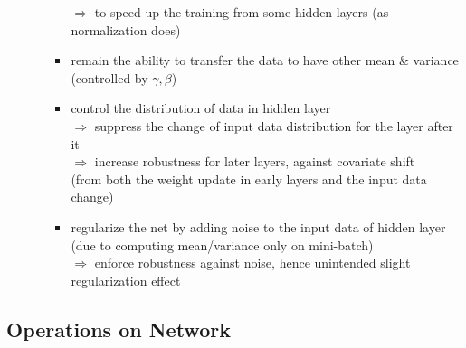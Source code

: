 \begin{itemize}
\begin{itemize}
\begin{itemize}
		$\Rightarrow$ to speed up the training from some hidden layers (as normalization does)
		\item remain the ability to transfer the data to have other mean \& variance \\
		(controlled by $\gamma,\beta$)
		\item control the distribution of data in hidden layer \\ 
		$\Rightarrow$ suppress the change of input data distribution for the layer after it \\
		$\Rightarrow$ increase robustness for later layers, against covariate shift \\ 
		(from both the weight update in early layers and the input data change)
		\item regularize the net by adding noise to the input data of hidden layer \\ 
		(due to computing mean/variance only on mini-batch) \\
		$\Rightarrow$ enforce robustness against noise, hence unintended slight regularization effect
		\end{itemize}
	\end{itemize}
\end{itemize}

\subsection{Operations on Network}

